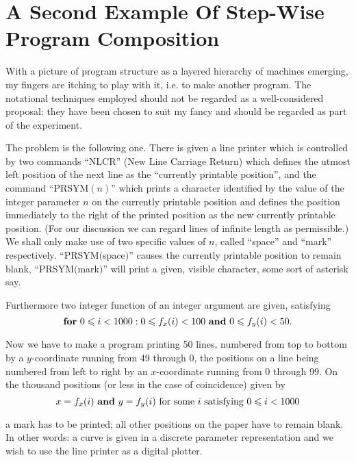 \section[A second example of step-wise program composition]{A Second Example Of Step-Wise Program Composition}

With a picture of program structure as a layered hierarchy of machines emerging, my fingers are itching to play with it, i.e. to make another program. The notational techniques employed should not be regarded as a well-considered proposal: they have been chosen to suit my fancy and should be regarded as part of the experiment.

The problem is the following one. There is given a line printer which is controlled by two commands ``NLCR'' (New Line Carriage Return) which defines the utmost left position of the next line as the ``currently printable position'', and the command ``PRSYM$(n)$'' which prints a character identified by the value of the integer parameter $n$ on the currently printable position and defines the position immediately to the right of the printed position as the new currently printable position. (For our discussion we can regard lines of infinite length as permissible.) We shall only make use of two specific values of $n$, called ``space'' and ``mark'' respectively. ``PRSYM$($space$)$'' causes the currently printable position to remain blank, ``PRSYM$($mark$)$'' will print a given, visible character, some sort of asterisk say.

Furthermore two integer function of an integer argument are given, satisfying
$$
\text{\textbf{for} } 0 \leqslant i < 1000 : 0 \leqslant f_x(i) < 100 \text{ \textbf{and} } 0 \leqslant f_y(i) < 50.
$$

Now we have to make a program printing 50 lines, numbered from top to bottom by a $y$-coordinate running from 49 through 0, the positions on a line being numbered from left to right by an $x$-coordinate running from 0 through 99. On the thousand positions (or less in the case of coincidence) given by
$$
x = f_x(i) \text{ \textbf{and} } y = f_y(i) \text{ for some } i \text{ satisfying } 0 \leqslant i < 1000
$$

\noindent
a mark has to be printed; all other positions on the paper have to remain blank. In other words: a curve is given in a discrete parameter representation and we wish to use the line printer as a digital plotter.

